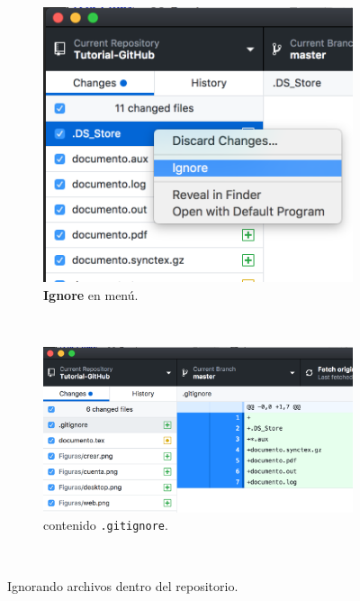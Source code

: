 \documentclass[10pt]{article}
\begin{document}
\begin{figure}[!h]
    \centering
    \begin{subfigure}[b]{0.25\textwidth}
        \includegraphics[width=\textwidth]{Figuras/ignorar1.png}
        \caption{\textbf{Ignore} en menú.}
        \label{ignore1}
    \end{subfigure}
    ~ %
    \begin{subfigure}[b]{0.5\textwidth}
        \includegraphics[width=\textwidth]{Figuras/ignorar2.png}
        \caption{contenido \texttt{.gitignore}.}
        \label{ignore2}
    \end{subfigure}
    ~ %
    \caption{Ignorando archivos dentro del repositorio.}\label{ignore}
\end{figure}
\end{document}
